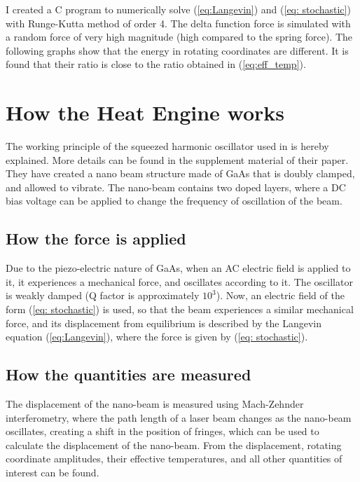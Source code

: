 \documentclass[12pt, twoside]{article}
\begin{document}
I created a C program \cite{link_to_c_code} to numerically solve (\ref{eq:Langevin}) and (\ref{eq: stochastic}) with Runge-Kutta method \cite{wikipedia_runge_kutta} of order 4. The delta function force is simulated with a random force of very high magnitude (high compared to the spring force).
The following graphs show that the energy in rotating coordinates are different. It is found that their ratio is close to the ratio obtained in (\ref{eq:eff_temp}).

\section{How the Heat Engine works}
The working principle of the squeezed harmonic oscillator used in \cite{klaers} is hereby explained. More details can be found in the supplement material \cite{klaers_supplement} of their paper. They have created a nano beam structure made of GaAs that is doubly clamped, and allowed to vibrate. The nano-beam contains two doped layers, where a DC bias voltage can be applied to change the frequency of oscillation of the beam. 
\subsection{How the force is applied}
Due to the piezo-electric nature of GaAs, when an AC electric field is applied to it, it experiences a mechanical force, and oscillates according to it. The oscillator is weakly damped (Q factor is approximately $10^3$). Now, an electric field of the form (\ref{eq: stochastic}) is used, so that the beam experiences a similar mechanical force, and its displacement from equilibrium is described by the Langevin equation (\ref{eq:Langevin}), where the force is given by (\ref{eq: stochastic}).
\subsection{How the quantities are measured}
The displacement of the nano-beam is measured using Mach-Zehnder interferometry, where the path length of a laser beam changes as the nano-beam oscillates, creating a shift in the position of fringes, which can be used to calculate the displacement of the nano-beam. From the displacement, rotating coordinate amplitudes, their effective temperatures, and all other quantities of interest can be found.
\end{document}

